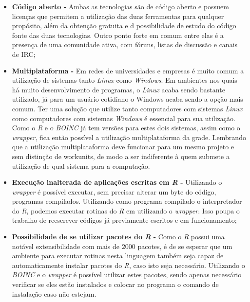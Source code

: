 \begin{itemize}
  \item \textbf{Código aberto -} Ambas as tecnologias são de código aberto e possuem licenças que permitem a utilização das duas
ferramentas para qualquer propósito, além da obtenção gratuita e d possibilidade de estudo do código fonte das duas tecnologias.
Outro ponto forte em comum entre elas é a presença de uma comunidade ativa, com fóruns, listas de discussão e canais de IRC;
  \item \textbf{Multiplataforma -}  Em redes de universidades e empresas é muito comum a utilização de sistemas tanto 
\emph{Linux} como \emph{Windows}. Em ambientes nos quais há muito desenvolvimento de programas, o \emph{Linux} acaba
sendo bastante utilizado, já para um usuário cotidiano o Windows acaba sendo a opção mais comum. Ter uma solução
que utilize tanto computadores com sistemas \emph{Linux} como computadores com sistemas \emph{Windows} é essencial 
para sua utilização. Como o \emph{R} e o \emph{BOINC} já tem versões para estes dois sistemas, assim como o \emph{wrapper}, 
fica então possível a utilização multiplataforma da grade. Lembrando que a utilização multiplataforma deve funcionar para um mesmo
projeto e sem distinção de workunits, de modo a ser indiferente à quem submete a utilização de qual sistema para a computação.
  \item \textbf{Execução inalterada de aplicações escritas em \emph{R} -} Utilizando o \emph{wrapper} é possível executar,
sem precisar alterar um byte do código, programas compilados. Utilizando como programa compilado o interpretador do 
\emph{R}, podemos executar rotinas do \emph{R} em utilizando o \emph{wrapper}. Isso poupa o trabalho de reescrever
códigos já previamente escritos e em funcionamento;
  \item \textbf{Possibilidade de se utilizar pacotes do \emph{R} -} Como o \emph{R} possui uma notável extensibilidade com mais
de $2000$ pacotes, é de se esperar que um ambiente para executar rotinas nesta linguagem também seja capaz de automaticamente instalar
pacotes do \emph{R}, caso isto seja necessário. Utilizando o \emph{BOINC} e o \emph{wrapper} é possível utilizar estes pacotes,
sendo apenas necessário verificar se eles estão instalados e colocar no programa o comando de instalação caso não estejam.
\end{itemize}

